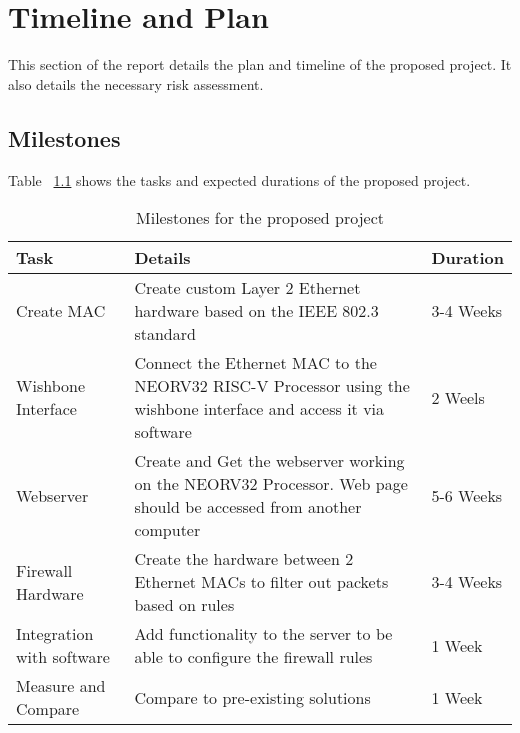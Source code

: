 
\chapter[Abbreviated title]{Timeline and Plan}
\label{Chap:label}	%
\pagestyle{headings}



This section of the report details the plan and timeline of the proposed project. It also details the necessary risk assessment.


\section{Milestones}
\label{Sec:label}	%

Table ~\ref{table:milestones} shows the tasks and expected durations of the proposed project.
  

\begin{table}[hbt!]
\centering%
    \begin{tabularx}{\textwidth}{ lXl }
        \hline
        Task                            & Details & Duration  \\ \hline
        Create MAC                      &  Create custom Layer 2 Ethernet hardware based on the IEEE 802.3 standard      & 3-4 Weeks \\
        Wishbone Interface              &  Connect the Ethernet MAC to the NEORV32 RISC-V Processor using the wishbone interface and access it via software       & 2 Weels   \\
        Webserver                       &  Create and Get the webserver working on the NEORV32 Processor. Web page should be accessed from another computer       & 5-6 Weeks \\ 
        Firewall Hardware               &  Create the hardware between 2 Ethernet MACs to filter out packets based on rules      & 3-4 Weeks \\ 
        Integration with software       &  Add functionality to the server to be able to configure the firewall rules       & 1 Week \\ 
        Measure and Compare             &  Compare to pre-existing solutions       & 1 Week \\ 
        \hline
        \end{tabularx}
\caption{ Milestones for the proposed project}\label{table:milestones}
\end{table}
 

